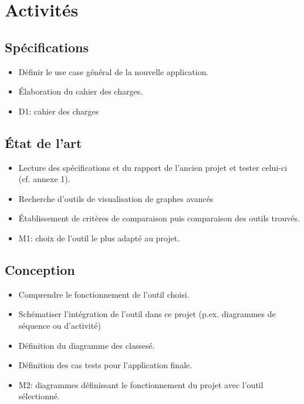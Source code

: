 \documentclass{article}
\begin{document}
\section{Activités}
  \subsection{Spécifications}
    \begin{itemize}
      \item Définir le use case général de la nouvelle application.
      \item Élaboration du cahier des charges.
      \item D1: cahier des charges
    \end{itemize}
  \subsection{État de l'art}
    \begin{itemize}
      \item Lecture des spécifications et du rapport de l'ancien projet et tester celui-ci (cf. annexe 1).
      \item Recherche d'outils de visualisation de graphes avancés
      \item Établissement de critères de comparaison puis comparaison des outils trouvés.
      \item M1: choix de l'outil le plus adapté au projet.
    \end{itemize}
  \subsection{Conception}
    \begin{itemize}
      \item Comprendre le fonctionnement de l'outil choisi.
      \item Schématiser l'intégration de l'outil dans ce projet (p.ex. diagrammes de séquence ou d'activité)
      \item Définition du diagramme des classesé.
      \item Définition des cas tests pour l'application finale.
      \item M2: diagrammes définissant le fonctionnement du projet avec l'outil sélectionné.
    \end{itemize}
\end{document}
